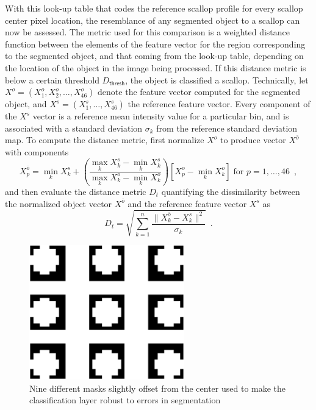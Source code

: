 \documentclass {udthesis}
\begin{document}
With this look-up table that codes the reference scallop profile for every scallop center pixel location,
the resemblance of any segmented object to a scallop can now be assessed.
The metric used for this comparison is a weighted distance function between the 
elements of the feature vector for the region corresponding to the segmented object, and that coming from the look-up table, depending on the location of the object in the image being processed.
If this distance metric is below a certain threshold $D_\mathsf{thresh}$, the object is classified
a scallop.
Technically, let $X^o=(X^o_1,X^o_2, \ldots,X^o_{46})$ denote the feature vector computed for the segmented object,
and $X^s=(X^s_1,\ldots,X^s_{46})$ the reference
feature vector. 
Every component of the $X^s$ vector is a reference mean intensity value for a particular bin, and is associated with a standard deviation $\sigma_k$ from the reference standard deviation map.
To compute the distance metric, first normalize $X^o$ to produce vector $X^{\bar{o}}$ with components 
%
\[
X^{\bar{o}}_p = \min_{k} X^s_k + \left(\frac{\max \limits_{k} X^s_k-\min \limits_{k} X^s_k}{\max \limits_{k} X^o_k-\min \limits _{k} X^o_k}
\right)\left[ X^o_p-\min_{k} X^o_k \right] \;\text{for } p=1,\ldots,46\enspace,
\]
%
and then evaluate the distance metric $D_{t}$ quantifying the dissimilarity between the normalized object vector $X^{\bar{o}}$ and the reference feature vector $X^s$ as
%
\begin{equation}\label{distance}
D_{t} = \sqrt{\sum_{k=1}^n\frac{\|X^{\bar{o}}_{k}-X^s_k\|^2}{\sigma_k}} \enspace .
\end{equation}
%

%
\begin{figure}
\centering
\includegraphics[width=0.6\textwidth]{mask_offset}
\caption{Nine different masks slightly offset from the center used to make the classification layer
robust to errors in segmentation}
\label{fig:scallop_masks}
\end{figure}
%
\end{document}
